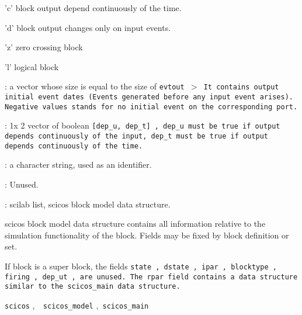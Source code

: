\begin{scitem}
\begin{scitem}
\item[{\verb?:?}]
'c'  block output depend continuously of the time.
\item[{\verb?:?}]
'd' block output changes only on input events.
\item[{\verb?:?}]
'z' zero crossing block
\item[{\verb?:?}]
'l' logical block
\end{scitem}
\item[{\verb?firing?}]
: a vector whose size is equal to the size of %
\tt evtout%
\rm $>$ It contains
output initial event dates (Events generated before any input event
arises). Negative values stands for no initial event on the
corresponding port.
\item[{\verb?dep\_ut?}]
: 1x 2 vector of boolean %
\tt [dep\_u, dep\_t]%
\rm , %
\tt dep\_u %
\rm must be
true if output depends continuously of the input, %
\tt dep\_t %
\rm must be
true if output depends continuously of the time.
\item[{\verb?label?}]
: a character string, used as an identifier. 
\item[{\verb?import?}]
: Unused.
\item[{\verb?model?}]
: scilab list, scicos block model data structure.
\end{scitem}%
scicos block model data structure contains all information relative
to the simulation functionality of the block. Fields may be
fixed by block definition or set. 

If block is a super block, the fields
%
\tt state%
\rm ,%
\tt dstate%
\rm ,%
\tt ipar%
\rm ,%
\tt blocktype%
\rm ,%
\tt firing%
\rm ,
%
\tt dep\_ut%
\rm , are unused. The %
\tt rpar %
\rm field contains a
data structure similar to the %
\tt scicos\_main %
\rm data structure.


{\verb?scicos?} \pageref{scicos},{\verb?  scicos_model?} \pageref{scicosmodel},{\verb? scicos_main ?} \pageref{scicosmain}











%
%


